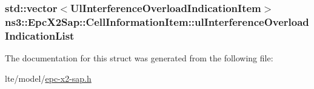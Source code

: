 \subsubsection[{\texorpdfstring{ul\+Interference\+Overload\+Indication\+List}{ulInterferenceOverloadIndicationList}}]{\setlength{\rightskip}{0pt plus 5cm}std\+::vector$<${\bf Ul\+Interference\+Overload\+Indication\+Item}$>$ ns3\+::\+Epc\+X2\+Sap\+::\+Cell\+Information\+Item\+::ul\+Interference\+Overload\+Indication\+List}\hypertarget{structns3_1_1EpcX2Sap_1_1CellInformationItem_af3d3f8711f0efe24d1d2d0997a5728ca}{}\label{structns3_1_1EpcX2Sap_1_1CellInformationItem_af3d3f8711f0efe24d1d2d0997a5728ca}


The documentation for this struct was generated from the following file\+:\begin{DoxyCompactItemize}
\item 
lte/model/\hyperlink{epc-x2-sap_8h}{epc-\/x2-\/sap.\+h}\end{DoxyCompactItemize}
